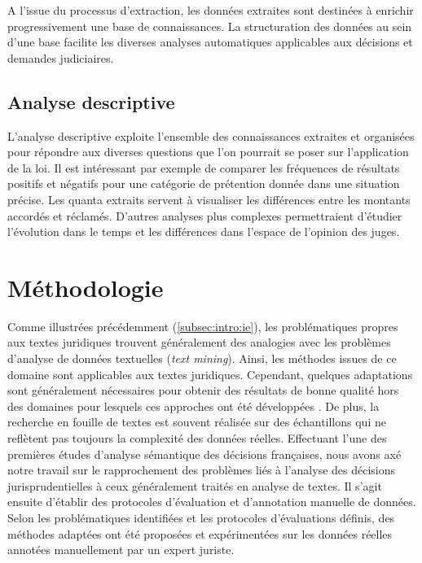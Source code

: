 A l'issue du processus d'extraction, les données extraites sont destinées à enrichir progressivement une base de connaissances. La structuration des données au sein d'une base facilite les diverses analyses automatiques applicables aux décisions et demandes judiciaires. 

\subsection{Analyse descriptive}
L'analyse descriptive exploite l'ensemble des connaissances extraites et organisées pour répondre aux diverses questions que l'on pourrait se poser sur l'application de la loi. Il est intéressant par exemple de comparer les fréquences de résultats positifs et négatifs pour une catégorie de prétention donnée dans une situation précise. Les quanta extraits servent à visualiser les différences entre les montants accordés et réclamés. D'autres analyses plus complexes permettraient d'étudier l'évolution dans le temps et les différences dans l'espace de l'opinion des juges.


\section{Méthodologie}
\label{sec:intro:methodologie}

Comme illustrées précédemment (\ref{subsec:intro:ie}), les problématiques propres aux textes juridiques trouvent généralement des analogies avec les problèmes d'analyse de données textuelles (\textit{text mining}). Ainsi, les méthodes issues de ce domaine sont applicables aux textes juridiques. Cependant, quelques adaptations sont généralement nécessaires pour obtenir des résultats de bonne qualité hors des domaines pour lesquels ces approches ont été développées \citep{Waltl2016lexia}. De plus, la recherche en fouille de textes est souvent réalisée sur des échantillons qui ne reflètent pas toujours la complexité des données réelles. Effectuant l'une des premières études d'analyse sémantique des décisions françaises, nous avons axé notre travail sur le rapprochement des problèmes liés à l'analyse des décisions jurisprudentielles à ceux généralement traités en analyse de textes. Il s'agit ensuite d'établir des protocoles d'évaluation et d'annotation manuelle de données. Selon les problématiques identifiées et les protocoles d'évaluations définis, des méthodes adaptées ont été proposées et expérimentées sur les données réelles annotées manuellement par un expert juriste.

